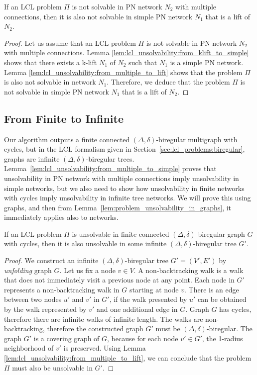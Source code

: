 \begin{lemma} \label{lem:lcl_unsolvability:from_multiple_to_simple}
    If an LCL problem $\Pi$ is not solvable in PN network $N_2$ with multiple connections, then it is also not solvable in simple PN network $N_1$ that is a lift of $N_2$.
\end{lemma}
\begin{proof}
    Let us assume that an LCL problem $\Pi$ is not solvable in PN network $N_2$ with multiple connections.
    Lemma \ref{lem:lcl_unsolvability:from_klift_to_simple} shows that there exists a k-lift $N_1$ of $N_2$ such that $N_1$ is a simple PN network.
    Lemma \ref{lem:lcl_unsolvability:from_multiple_to_lift} shows that the problem $\Pi$ is also not solvable in network $N_1$.
    Therefore, we deduce that the problem $\Pi$ is not solvable in simple PN network $N_1$ that is a lift of $N_2$.
\end{proof}


\subsection{From Finite to Infinite} \label{sec:algorithm:from_finite_to_infinite}
Our algorithm outputs a finite connected $(\Delta, \delta)$-biregular multigraph with cycles, but in the LCL formalism given in Section~\ref{sec:lcl_problems:biregular}, graphs are infinite $(\Delta, \delta)$-biregular trees.
Lemma~\ref{lem:lcl_unsolvability:from_multiple_to_simple} proves that unsolvability in PN network with multiple connections imply unsolvability in simple networks, but we also need to show how unsolvability in finite networks with cycles imply unsolvability in infinite tree networks.
We will prove this using graphs, and then from Lemma~\ref{lem:problem_unsolvability_in_graphs}, it immediately applies also to networks.

\begin{lemma} \label{lem:from_finite_to_infinite}
    If an LCL problem $\Pi$ is unsolvable in finite connected $(\Delta, \delta)$-biregular graph $G$ with cycles, then it is also unsolvable in some infinite $(\Delta, \delta)$-biregular tree $G'$.
\end{lemma}
\begin{proof}
    We construct an infinite $(\Delta, \delta)$-biregular tree $G'=(V', E')$ by \emph{unfolding} graph $G$.
    Let us fix a node $v \in V$.
    A non-backtracking walk is a walk that does not immediately visit a previous node at any point.
    Each node in $G'$ represents a non-backtracking walk in $G$ starting at node $v$.
    There is an edge between two nodes $u'$ and $v'$ in $G'$, if the walk presented by $u'$ can be obtained by the walk represented by $v'$ and one additional edge in $G$.
    Graph $G$ has cycles, therefore there are infinite walks of infinite length.
    The walks are non-backtracking, therefore the constructed graph $G'$ must be $(\Delta, \delta)$-biregular.
    The graph $G'$ is a covering graph of $G$, because for each node $v' \in G'$, the 1-radius neighborhood of $v'$ is preserved.
    Using Lemma \ref{lem:lcl_unsolvability:from_multiple_to_lift}, we can conclude that the problem $\Pi$ must also be unsolvable in $G'$.
\end{proof}

